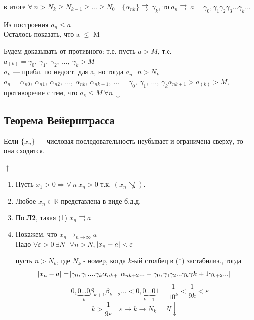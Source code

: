 \documentclass{article}
\begin{document}
    в итоге \( \forall\ n > N_k \geq N_{k-1} \geq ... \geq N_0\quad \{ \alpha_{nk} \} \rightrightarrows\ \gamma_k \), то \( a_n \rightrightarrows\ a = \gamma_0,\gamma_1\gamma_2\gamma_3...\gamma_k... \)
    
    Из построения \(a_n \leq a \)
    \\ Осталось показать, что a \(\leq\) M

    Будем доказывать от противного: т.е. пусть \(a > M\), т.е. \(a_{(k)} = \gamma_0,\ \gamma_1,\ \gamma_2,\ ...,\ \gamma_k > M\)
    \\ \(a_k\) --- прибл. по недост. для a, но тогда \(a_n \ \: \ n > N_k\)
    \\ \(a_n = \alpha_{n0},\ \alpha_{n1},\ \alpha_{n2},\ ...,\ \alpha_{nk},\ \alpha_{nk+1},\ ... = \gamma_0,\ \gamma_1,\ ...,\ \gamma_k\alpha_{nk+1} > a_{(k)} > M\), противоречие с тем, что \(a_n \leq M \ \forall n \ \downarrow\)
    
    \subsection{Теорема Вейерштрасса}
    
    Если \(\{ x_n \} \) --- числовая последовательность неубывает и ограничена сверху, то она сходится.

    \(\uparrow\)
    \begin{enumerate}
        \item Пусть \( x_1 > 0 \Rightarrow \forall\ n\ x_n > 0 \) т.к. \( (x_n \not\searrow ) \).

        \item Любое \( x_n \in \mathbb{R} \) представлена в виде б.д.д.

        \item По \textbf{Л2}, такая (1) \( x_n \rightrightarrows a \)

        \item Покажем, что \(x_n \longrightarrow_{n \rightarrow \infty} a\)
    \\ Надо \(\forall \varepsilon > 0 \ \exists N \ \: \ \forall n > N\), \(\abs{x_n - a} < \varepsilon\)

    пусть \( n > N_k \), где \( N_k \) - номер, когда \(k\)-ый столбец в (*) застабилиз., тогда 
    \[ \abs{x_n - a} = \abs{\gamma_0,\gamma_1....\gamma_k\alpha_{nk+1}\alpha_{nk+2}... - \gamma_0,\gamma_1\gamma_2...\gamma_k\gamma{k+1}\gamma_{k+2}...} \]
    \[ = 0,\underbrace{0...0}_k\beta_{k+1}\beta_{k+2}... < 0,\underbrace{0...0}_{k-1}1 = \frac{1}{10^k} < \frac{1}{9k} < \varepsilon \]
    \[k > \frac{1}{9\varepsilon}\quad \varepsilon \rightarrow k \rightarrow N_k = N \downarrow \]
    \end{enumerate}
\end{document}
